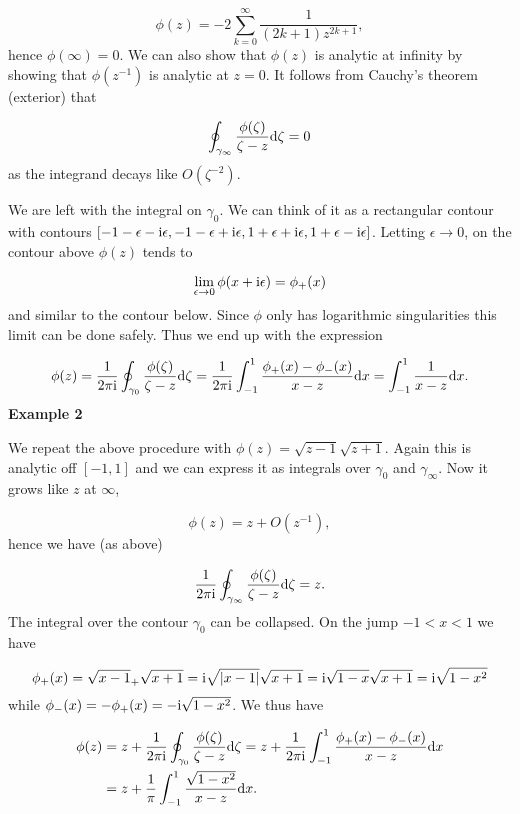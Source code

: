 \documentclass[12pt,a4paper]{article}
\def\D{ {\rm d} }
\def\I{ {\rm i} }
\begin{document}
\[
\phi(z) = -2\sum_{k=0}^{\infty} \frac{1}{(2k+1)z^{2k+1} },
\]
hence $\phi(\infty) = 0$. We can also show that $\phi(z)$ is analytic at infinity by showing that  $\phi(z^{-1})$ is analytic at $z = 0$. It follows from Cauchy's theorem (exterior) that

\[
\oint_{\gamma_\infty} {\phi(\zeta) \over \zeta -z} \D \zeta = 0
\]
as the integrand decays like $O(\zeta^{-2})$.

We are left with the integral on $\gamma_0$. We can think of it as a rectangular contour with contours $[-1-\epsilon-\I \epsilon, -1 -\epsilon+\I \epsilon,1 +\epsilon+\I\epsilon,1+\epsilon-\I \epsilon]$. Letting $\epsilon \rightarrow 0$, on the contour above $\phi(z)$ tends to

\[
\lim_{\epsilon \rightarrow 0} \phi(x + \I \epsilon) = \phi_+(x)
\]
and similar to the contour below. Since $\phi$ only has logarithmic singularities this limit can be done safely. Thus we end up with the expression

\[
\phi(z) = {1 \over 2 \pi \I} \oint_{\gamma_0} {\phi(\zeta) \over \zeta -z} \D \zeta =
        {1 \over 2 \pi \I} \int_{-1}^1 {\phi_+(x) - \phi_-(x) \over x - z} \D x = \int_{-1}^1 {1 \over x -z} \D x.
\]
\textbf{Example 2}

We repeat the above procedure with $\phi(z) = \sqrt{z-1} \sqrt{z+1}$. Again this is analytic off $[-1,1]$ and we can express it as integrals over $\gamma_0$ and $\gamma_\infty$. Now it grows like $z$ at $\infty$,

\[
\phi(z) = z + O(z^{-1}),
\]
hence we have (as above)

\[
{1 \over 2 \pi \I} \oint_{\gamma_\infty} {\phi(\zeta) \over \zeta - z} \D \zeta = z.
\]
The integral over the contour $\gamma_0$ can be collapsed. On the jump $-1 < x < 1$ we have

\[
\phi_+(x) = \sqrt{x-1}_+ \sqrt{x+1} = \I \sqrt{|x-1|} \sqrt{x+1} = \I \sqrt{1-x} \sqrt{x+1} = \I \sqrt{1-x^2}
\]
while $\phi_-(x) = - \phi_+(x) = - \I \sqrt{1-x^2}$. We thus have


\begin{align*}
\phi(z) &= z + {1 \over 2 \pi \I} \oint_{\gamma_0} {\phi(\zeta) \over \zeta -z} \D \zeta =
        z + {1 \over 2 \pi \I} \int_{-1}^1 {\phi_+(x) - \phi_-(x) \over x - z} \D x \\
        &=
        z + {1 \over \pi} \int_{-1}^1 {\sqrt{1-x^2} \over x -z} \D x.
\end{align*}
\end{document}
